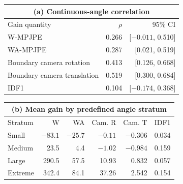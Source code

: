 \begin{tabular}[t]{lrr}
    \multicolumn{3}{c}{\textbf{(a) Continuous-angle correlation}} \\[2pt]
    \toprule
    Gain quantity & $\rho$ & 95\% CI \\
    \midrule
    W-MPJPE & 0.266 & [$-0.011$, 0.510] \\
    WA-MPJPE & 0.287 & [0.021, 0.519] \\
    Boundary camera rotation & 0.413 & [0.126, 0.668] \\
    Boundary camera translation & 0.519 & [0.300, 0.684] \\
    IDF1 & 0.104 & [$-0.174$, 0.368] \\
    \bottomrule
\end{tabular}
\qquad
\begin{tabular}[t]{lrrrrr}
    \multicolumn{6}{c}{\textbf{(b) Mean gain by predefined angle stratum}} \\[2pt]
    \toprule
    Stratum & W & WA & Cam. R & Cam. T & IDF1 \\
    \midrule
    Small   & $-83.1$ & $-25.7$ & $-0.11$ & $-0.306$ & 0.034 \\
    Medium  & 23.5 & 4.4 & $-1.02$ & $-0.984$ & 0.159 \\
    Large   & 290.5 & 57.5 & 10.93 & 0.832 & 0.057 \\
    Extreme & 342.4 & 84.1 & 37.26 & 2.542 & 0.154 \\
    \bottomrule
\end{tabular}
